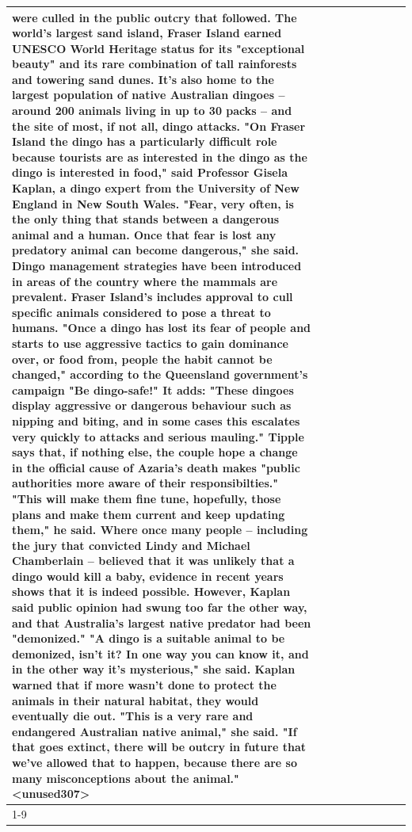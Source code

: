 \begin{table}[H]
\begin{tabular}{lllrlllll}
were culled in the public outcry that followed. The world's largest sand island, Fraser Island earned UNESCO World Heritage status for its "exceptional beauty" and its rare combination of tall rainforests and towering sand dunes. It's also home to the largest population of native Australian dingoes -- around 200 animals living in up to 30 packs -- and the site of most, if not all, dingo attacks. "On Fraser Island the dingo has a particularly difficult role because tourists are as interested in the dingo as the dingo is interested in food," said Professor Gisela Kaplan, a dingo expert from the University of New England in New South Wales. "Fear, very often, is the only thing that stands between a dangerous animal and a human. Once that fear is lost any predatory animal can become dangerous," she said. Dingo management strategies have been introduced in areas of the country where the mammals are prevalent. Fraser Island's includes approval to cull specific animals considered to pose a threat to humans. "Once a dingo has lost its fear of people and starts to use aggressive tactics to gain dominance over, or food from, people the habit cannot be changed," according to the Queensland government's campaign "Be dingo-safe!" It adds: "These dingoes display aggressive or dangerous behaviour such as nipping and biting, and in some cases this escalates very quickly to attacks and serious mauling." Tipple says that, if nothing else, the couple hope a change in the official cause of Azaria's death makes "public authorities more aware of their responsibilties." "This will make them fine tune, hopefully, those plans and make them current and keep updating them," he said. Where once many people -- including the jury that convicted Lindy and Michael Chamberlain -- believed that it was unlikely that a dingo would kill a baby, evidence in recent years shows that it is indeed possible. However, Kaplan said public opinion had swung too far the other way, and that Australia's largest native predator had been "demonized." "A dingo is a suitable animal to be demonized, isn't it? In one way you can know it, and in the other way it's mysterious," she said. Kaplan warned that if more wasn't done to protect the animals in their natural habitat, they would eventually die out. "This is a very rare and endangered Australian native animal," she said. "If that goes extinct, there will be outcry in future that we've allowed that to happen, because there are so many misconceptions about the animal."<unused307> \\
\cline{1-9}

\end{tabular}
\end{table}
